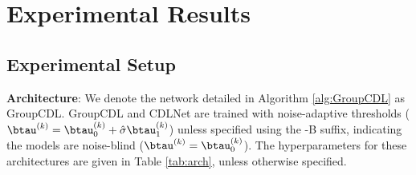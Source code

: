 \documentclass[lettersize,journal]{IEEEtran}
\begin{document}
\section{Experimental Results} \label{sec:results}
\subsection{Experimental Setup}
\textbf{Architecture}: We denote the network detailed in Algorithm \ref{alg:GroupCDL} as
GroupCDL. GroupCDL and CDLNet are trained with noise-adaptive thresholds ($\btau^{(k)} = \btau^{(k)}_0 + \hat{\sigma}\btau^{(k)}_1$) unless specified using the
-B suffix, indicating the models are noise-blind ($\btau^{(k)} = \btau^{(k)}_0$). The hyperparameters for these architectures are
given in Table \ref{tab:arch}, unless otherwise specified.

\begin{table}[tb]
\caption{Architectures of the GroupCDL models, CDLNet models, and variants presented in the experimental section. 
We use $C=3$ and $C=1$ for color and grayscale denoising networks, respectively.
A filter size of $7\times 7$ is used for all models. Conv-stride
$s_c=2$, adjacency update period $\Delta K=5$, is used unless otherwise specified.}
\centering
{}
\label{tab:arch}
\end{table}
\end{document}
